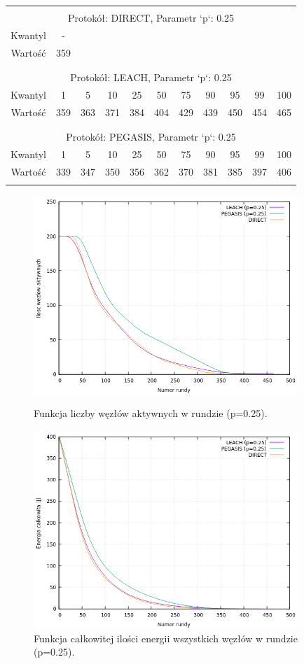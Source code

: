 \documentclass[a4paper,12pt,twoside,openany]{report}
\begin{document}
\begin{longtable}{*{11}{c}}
\toprule \\*
\multicolumn{11}{c}{Protokół: DIRECT, Parametr `p`: 0.25} \\*
Kwantyl	& -	\\*
Wartość	& 359	\\*
\midrule \\*
\\*
\multicolumn{11}{c}{Protokół: LEACH, Parametr `p`: 0.25} \\*
Kwantyl	& 1	& 5	& 10	& 25	& 50	& 75	& 90	& 95	& 99	& 100	\\*
Wartość	& 359	& 363	& 371	& 384	& 404	& 429	& 439	& 450	& 454	& 465	\\*
\midrule \\*
\\*
\multicolumn{11}{c}{Protokół: PEGASIS, Parametr `p`: 0.25} \\*
Kwantyl	& 1	& 5	& 10	& 25	& 50	& 75	& 90	& 95	& 99	& 100	\\*
Wartość	& 339	& 347	& 350	& 356	& 362	& 370	& 381	& 385	& 397	& 406	\\*	
\bottomrule \\*
\end{longtable}

\begin{figure}[H]
 \centering
 \includegraphics[width=10cm]{images/gnuplot/test_4/nodes_in_round_p025.png}
 \caption{Funkcja liczby węzłów aktywnych w rundzie (p=0.25).}
 \includegraphics[width=10cm]{images/gnuplot/test_4/energy_in_round_p025.png}
 \caption{Funkcja całkowitej ilości energii wszystkich węzłów w rundzie (p=0.25).}
\end{figure}
\end{document}
